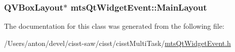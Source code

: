 \subsubsection[{Main\+Layout}]{\setlength{\rightskip}{0pt plus 5cm}Q\+V\+Box\+Layout$\ast$ mts\+Qt\+Widget\+Event\+::\+Main\+Layout\hspace{0.3cm}{\ttfamily [protected]}}\label{classmts_qt_widget_event_a9f914a226a59e9181130296046811466}


The documentation for this class was generated from the following file\+:\begin{DoxyCompactItemize}
\item 
/\+Users/anton/devel/cisst-\/saw/cisst/cisst\+Multi\+Task/\hyperlink{mts_qt_widget_event_8h}{mts\+Qt\+Widget\+Event.\+h}\end{DoxyCompactItemize}

